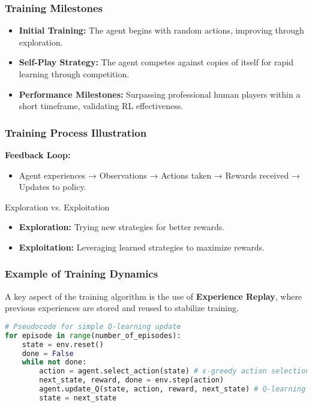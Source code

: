 \documentclass[aspectratio=169]{beamer}
\begin{document}
\begin{frame}[fragile]
    \frametitle{Training Milestones}

    \begin{itemize}
        \item \textbf{Initial Training:} 
        The agent begins with random actions, improving through exploration.
        
        \item \textbf{Self-Play Strategy:} 
        The agent competes against copies of itself for rapid learning through competition.
        
        \item \textbf{Performance Milestones:} 
        Surpassing professional human players within a short timeframe, validating RL effectiveness.
    \end{itemize}
    
\end{frame}

\begin{frame}[fragile]
    \frametitle{Training Process Illustration}

    \textbf{Feedback Loop:} 

    \begin{itemize}
        \item Agent experiences → Observations → Actions taken → Rewards received → Updates to policy.
    \end{itemize}

    \begin{block}{Exploration vs. Exploitation}
        \begin{itemize}
            \item \textbf{Exploration:} Trying new strategies for better rewards.
            \item \textbf{Exploitation:} Leveraging learned strategies to maximize rewards.
        \end{itemize}
    \end{block}
    
\end{frame}

\begin{frame}[fragile]
    \frametitle{Example of Training Dynamics}

    A key aspect of the training algorithm is the use of \textbf{Experience Replay}, where previous experiences are stored and reused to stabilize training.

    \begin{lstlisting}[language=Python, caption=Pseudocode for Q-learning Update]
# Pseudocode for simple Q-learning update
for episode in range(number_of_episodes):
    state = env.reset()
    done = False
    while not done:
        action = agent.select_action(state) # ε-greedy action selection
        next_state, reward, done = env.step(action)
        agent.update_Q(state, action, reward, next_state) # Q-learning update
        state = next_state
    \end{lstlisting}

\end{frame}
\end{document}
